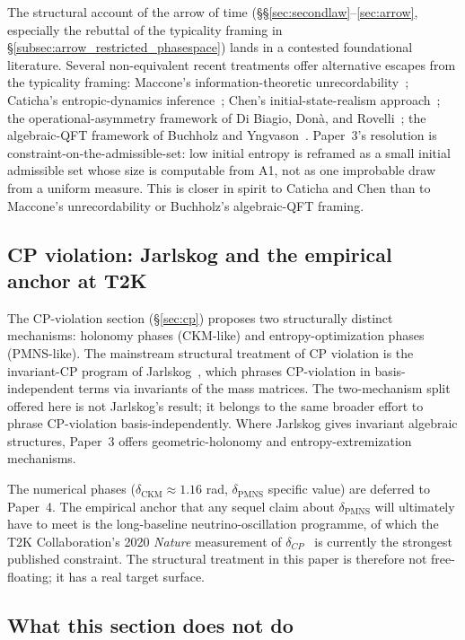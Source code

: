 \documentclass[11pt]{article}
\begin{document}
The structural account of the arrow of time
(\S\S\ref{sec:secondlaw}--\ref{sec:arrow}, especially the rebuttal of the
typicality framing in
\S\ref{subsec:arrow_restricted_phasespace}) lands in a contested foundational
literature.  Several non-equivalent recent treatments offer alternative
escapes from the typicality framing:
Maccone's information-theoretic unrecordability~\cite{Maccone2009};
Caticha's entropic-dynamics inference~\cite{Caticha2011};
Chen's initial-state-realism approach~\cite{Chen2019};
the operational-asymmetry framework of Di Biagio, Don\`a, and
Rovelli~\cite{DiBiagio2021};
the algebraic-QFT framework of Buchholz and Yngvason~\cite{Buchholz2023}.
Paper~3's resolution is constraint-on-the-admissible-set: low initial entropy
is reframed as a small initial admissible set whose size is computable from
A1, not as one improbable draw from a uniform measure.  This is closer in
spirit to Caticha and Chen than to Maccone's unrecordability or Buchholz's
algebraic-QFT framing.

\subsection{CP violation: Jarlskog and the empirical anchor at T2K}

The CP-violation section (\S\ref{sec:cp}) proposes two structurally distinct
mechanisms: holonomy phases (CKM-like) and entropy-optimization phases
(PMNS-like).  The mainstream structural treatment of CP violation is the
invariant-CP program of Jarlskog~\cite{Jarlskog2005,Jarlskog2012}, which
phrases CP-violation in basis-independent terms via invariants of the mass
matrices.  The two-mechanism split offered here is not Jarlskog's result;
it belongs to the same broader effort to phrase CP-violation
basis-independently.  Where Jarlskog gives invariant algebraic structures,
Paper~3 offers geometric-holonomy and entropy-extremization mechanisms.

The numerical phases ($\delta_{\mathrm{CKM}} \approx 1.16$ rad,
$\delta_{\mathrm{PMNS}}$ specific value) are deferred to Paper~4.  The
empirical anchor that any sequel claim about $\delta_{\mathrm{PMNS}}$ will
ultimately have to meet is the long-baseline neutrino-oscillation programme,
of which the T2K Collaboration's 2020 \emph{Nature} measurement of
$\delta_{CP}$~\cite{T2K2020} is currently the strongest published constraint.
The structural treatment in this paper is therefore not free-floating; it has
a real target surface.

\subsection{What this section does not do}
\end{document}

